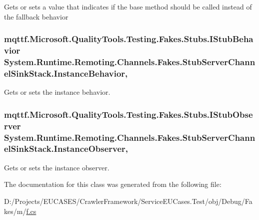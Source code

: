 Gets or sets a value that indicates if the base method should be called instead of the fallback behavior

\hypertarget{class_system_1_1_runtime_1_1_remoting_1_1_channels_1_1_fakes_1_1_stub_server_channel_sink_stack_a1d796a7a3c360e5afc51a1efece9b5e9}{
\subsubsection[{Instance\-Behavior}]{\setlength{\rightskip}{0pt plus 5cm}mqttf.\-Microsoft.\-Quality\-Tools.\-Testing.\-Fakes.\-Stubs.\-I\-Stub\-Behavior System.\-Runtime.\-Remoting.\-Channels.\-Fakes.\-Stub\-Server\-Channel\-Sink\-Stack.\-Instance\-Behavior\hspace{0.3cm}{\ttfamily [get]}, {\ttfamily [set]}}}\label{class_system_1_1_runtime_1_1_remoting_1_1_channels_1_1_fakes_1_1_stub_server_channel_sink_stack_a1d796a7a3c360e5afc51a1efece9b5e9}


Gets or sets the instance behavior.

\hypertarget{class_system_1_1_runtime_1_1_remoting_1_1_channels_1_1_fakes_1_1_stub_server_channel_sink_stack_ac8daf6ccf0977187c3930797b72fc1a9}{
\subsubsection[{Instance\-Observer}]{\setlength{\rightskip}{0pt plus 5cm}mqttf.\-Microsoft.\-Quality\-Tools.\-Testing.\-Fakes.\-Stubs.\-I\-Stub\-Observer System.\-Runtime.\-Remoting.\-Channels.\-Fakes.\-Stub\-Server\-Channel\-Sink\-Stack.\-Instance\-Observer\hspace{0.3cm}{\ttfamily [get]}, {\ttfamily [set]}}}\label{class_system_1_1_runtime_1_1_remoting_1_1_channels_1_1_fakes_1_1_stub_server_channel_sink_stack_ac8daf6ccf0977187c3930797b72fc1a9}


Gets or sets the instance observer.



The documentation for this class was generated from the following file\-:\begin{DoxyCompactItemize}
\item 
D\-:/\-Projects/\-E\-U\-C\-A\-S\-E\-S/\-Crawler\-Framework/\-Service\-E\-U\-Cases.\-Test/obj/\-Debug/\-Fakes/m/\hyperlink{m_2f_8cs}{f.\-cs}\end{DoxyCompactItemize}
